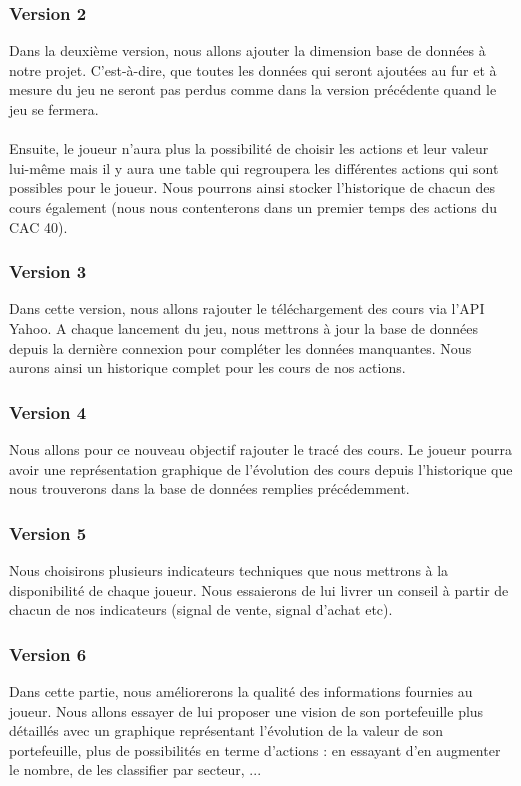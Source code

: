 \subsubsection{Version 2}
Dans la deuxième version, nous allons ajouter la dimension base de données à notre projet. C'est-à-dire, que toutes les données qui seront ajoutées au fur et à mesure du jeu ne seront pas perdus comme dans la version précédente quand le jeu se fermera. \\ \\
Ensuite, le joueur n'aura plus la possibilité de choisir les actions et leur valeur lui-même mais il y aura une table qui regroupera les différentes actions qui sont possibles pour le joueur. Nous pourrons ainsi stocker l'historique de chacun des cours également (nous nous contenterons dans un premier temps des actions du CAC 40). 

\subsubsection{Version 3}
Dans cette version, nous allons rajouter le téléchargement des cours via l'API Yahoo. A chaque lancement du jeu, nous mettrons à jour la base de données depuis la dernière connexion pour compléter les données manquantes. Nous aurons ainsi un historique complet pour les cours de nos actions. 

\subsubsection{Version 4}
Nous allons pour ce nouveau objectif rajouter le tracé des cours. Le joueur pourra avoir une représentation graphique de l'évolution des cours depuis l'historique que nous trouverons dans la base de données remplies précédemment. 

\subsubsection{Version 5}
Nous choisirons plusieurs indicateurs techniques que nous mettrons à la disponibilité de chaque joueur. Nous essaierons de lui livrer un conseil à partir de chacun de nos indicateurs (signal de vente, signal d'achat etc). 

\subsubsection{Version 6}
Dans cette partie, nous améliorerons la qualité des informations fournies au joueur. Nous  
allons essayer de lui proposer une vision de son portefeuille plus détaillés avec un graphique représentant l'évolution de la valeur de son portefeuille, plus de possibilités en terme d'actions : en essayant d'en augmenter le nombre, de les classifier par secteur, ...

